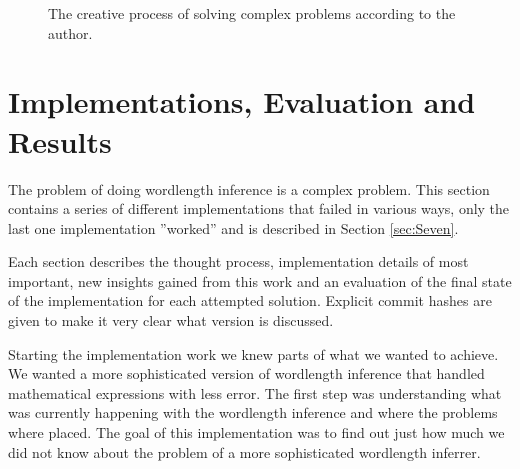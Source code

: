 \documentclass[msc,lith,english]{liuthesis}
\begin{document}
\begin{center}
\begin{figure}[h!]
\centering
{}
\caption{The creative process of solving complex problems according to the author.}
\label{figCreativeProcess}
\end{figure}
\end{center}

\chapter{Implementations, Evaluation and Results}
\label{cha:Implementation}
The problem of doing wordlength inference is a complex problem. This section contains a series of different implementations that failed in various ways, only the last one implementation ''worked'' and is described in Section \ref{sec:Seven}.

Each section describes the thought process, implementation details of most important, new insights gained from this work and an evaluation of the final state of the implementation for each attempted solution. Explicit commit hashes are given to make it very clear what version is discussed.

Starting the implementation work we knew parts of what we wanted to achieve. We wanted a more sophisticated version of wordlength inference that handled mathematical expressions with less error. The first step was understanding what was currently happening with the wordlength inference and where the problems where placed. The goal of this implementation was to find out just how much we did not know about the problem of a more sophisticated wordlength inferrer.
\end{document}
